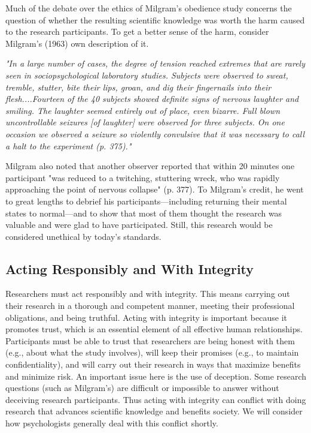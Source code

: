 Much of the debate over the ethics of Milgram's obedience study concerns the question of whether the resulting scientific knowledge was worth the harm caused to the research participants. To get a better sense of the harm, consider Milgram's (1963) own description of it.

\emph{"In a large number of cases, the degree of tension reached extremes that are rarely seen in sociopsychological laboratory studies. Subjects were observed to sweat, tremble, stutter, bite their lips, groan, and dig their fingernails into their flesh....Fourteen of the 40 subjects showed definite signs of nervous laughter and smiling. The laughter seemed entirely out of place, even bizarre. Full blown uncontrollable seizures [of laughter] were observed for three subjects. On one occasion we observed a seizure so violently convulsive that it was necessary to call a halt to the experiment (p. 375)."}

Milgram also noted that another observer reported that within 20 minutes one participant "was reduced to a twitching, stuttering wreck, who was rapidly approaching the point of nervous collapse" (p. 377). To Milgram's credit, he went to great lengths to debrief his participants---including returning their mental states to normal---and to show that most of them thought the research was valuable and were glad to have participated. Still, this research would be considered unethical by today's standards.


\subsection{Acting Responsibly and With Integrity}

Researchers must act responsibly and with integrity. This means carrying out their research in a thorough and competent manner, meeting their professional obligations, and being truthful. Acting with integrity is important because it promotes trust, which is an essential element of all effective human relationships. Participants must be able to trust that researchers are being honest with them (e.g., about what the study involves), will keep their promises (e.g., to maintain confidentiality), and will carry out their research in ways that maximize benefits and minimize risk. An important issue here is the use of deception. Some research questions (such as Milgram's) are
difficult or impossible to answer without deceiving research participants. Thus acting with integrity can conflict with doing research that advances scientific knowledge and benefits society. We will consider how psychologists generally deal with this conflict shortly.

